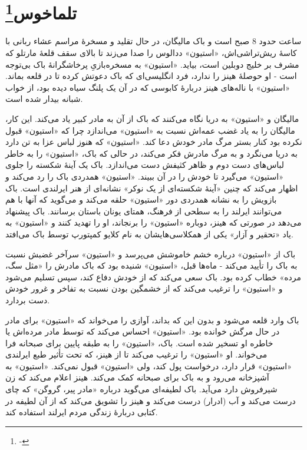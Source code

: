 \documentclass[12pt]{book}
\newcommand{\noun}[1]{«{#1}»}
\begin{document}
    \chapter[تلماخوس]{تلماخوس\protect\footnote{-}}\label{ep:1}
    ساعت حدود 8 صبح است و باک مالیگان، در حال تقلید و مسخرۀ مراسم عشاء ربانی با کاسۀ ریش‌تراشی‌اش، \noun{استیون} ددالوس را صدا می‌زند تا بالای سقف قلعۀ مارتلو که مشرف بر خلیج دوبلین است، بیاید.  \noun{استیون} به مسخره‌بازیِ پرخاشگرانۀ باک بی‌توجه است - او حوصلۀ هینز را ندارد، فرد انگلیسی‌ای که باک دعوتش کرده تا در قلعه بماند. \noun{استیون} با ناله‌های هینز دربارۀ کابوسی که در آن یک پلنگ سیاه دیده بود، از خواب شبانه بیدار شده است.

    مالیگان و \noun{استیون} به دریا نگاه می‌کنند که باک از آن به مادر کبیر یاد می‌کند. این کار، مالیگان را به یاد غضب عمه‌اش نسبت به \noun{استیون} می‌اندازد چرا که \noun{استیون} قبول نکرده بود کنار بستر مرگ مادر خودش دعا کند. \noun{استیون} که هنوز لباس عزا به تن دارد به دریا می‌نگرد و به مرگ مادرش فکر می‌کند، در حالی که باک، \noun{استیون} را به خاطر لباس‌‌های دست دوم و ظاهر کثیفش دست می‌اندازد. باک یک آینۀ شکسته را جلوی \noun{استیون} می‌گیرد تا خودش را در آن ببیند. \noun{استیون} همدردی باک را رد می‌کند و اظهار می‌کند که چنین «آینۀ شکسته‌ای از یک نوکر» نشانه‌ای از هنر ایرلندی است. باک بازویش را به نشانه همدردی دور \noun{استیون} حلقه می‌کند و می‌گوید که آنها با هم می‌توانند ایرلند را به سطحی از فرهنگ، همتای یونان باستان برسانند. باک پیشنهاد می‌دهد در صورتی که هینز، دوباره \noun{استیون} را برنجاند، او را تهدید کنند و \noun{استیون} به یاد «تحقیر و آزار» یکی از همکلاسی‌هایشان به نام کلایو کمپتورپ توسط باک می‌افتد.

    باک از \noun{استیون} درباره خشم خاموشش می‌پرسد و \noun{استیون} سرآخر غضبش نسبت به باک را تأیید می‌کند - ماه‌ها قبل، \noun{استیون} شنیده بود که باک مادرش را «مثل سگ، مرده» خطاب کرده بود. باک سعی می‌کند که از خودش دفاع کند، سپس تسلیم می‌شود و \noun{استیون} را ترغیب می‌کند که از خشمگین بودن نسبت به تفاخر و غرور خودش دست بردارد.

    باک وارد قلعه می‌شود و بدون این که بداند، آوازی را می‌خواند که \noun{استیون} برای مادر در حال مرگش خوانده بود. \noun{استیون} احساس می‌کند که توسط مادر مرده‌اش یا خاطره او تسخیر شده است. باک، \noun{استیون} را به طبقه پایین برای صبحانه فرا می‌خواند. او \noun{استیون} را ترغیب می‌کند تا از هینز، که تحت تأثیر طبع ایرلندی \noun{استیون} قرار دارد، درخواست پول کند، ولی \noun{استیون} قبول نمی‌کند. \noun{استیون} به آشپزخانه می‌رود و به باک برای صبحانه کمک می‌کند. هینز اعلام می‌کند که زن شیرفروش دارد می‌آید. باک لطیفه‌ای می‌گوید درباره «مادر پیر، گروگن» که چای درست می‌کند و آب (ادرار) درست می‌کند و هینز را تشویق می‌کند که از آن لطیفه در کتابی دربارۀ زندگی مردم ایرلند استفاده کند.
\end{document}

